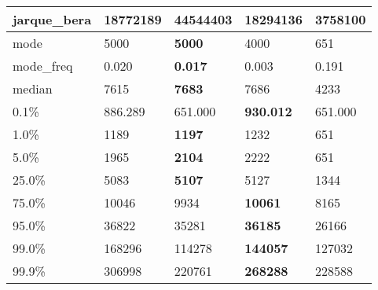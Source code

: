\begin{table}[H]
\begin{tabular}{|l|m{10em}|m{10em}|m{10em}|m{10em}|}
\hline jarque\_bera & 18772189 & \cellcolor[rgb]{0.9, 0.54, 0.52} 44544403 & \bfseries 18294136 & 3758100 \\
\hline mode & 5000 & \bfseries 5000 & 4000 & \cellcolor[rgb]{0.9, 0.54, 0.52} 651 \\
\hline mode\_freq & 0.020 & \bfseries 0.017 & 0.003 & \cellcolor[rgb]{0.9, 0.54, 0.52} 0.191 \\
\hline median & 7615 & \bfseries 7683 & 7686 & \cellcolor[rgb]{0.9, 0.54, 0.52} 4233 \\
\hline 0.1\% & 886.289 & \cellcolor[rgb]{0.9, 0.54, 0.52} 651.000 & \bfseries 930.012 & \cellcolor[rgb]{0.9, 0.54, 0.52} 651.000 \\
\hline 1.0\% & 1189 & \bfseries 1197 & 1232 & \cellcolor[rgb]{0.9, 0.54, 0.52} 651 \\
\hline 5.0\% & 1965 & \bfseries 2104 & 2222 & \cellcolor[rgb]{0.9, 0.54, 0.52} 651 \\
\hline 25.0\% & 5083 & \bfseries 5107 & 5127 & \cellcolor[rgb]{0.9, 0.54, 0.52} 1344 \\
\hline 75.0\% & 10046 & 9934 & \bfseries 10061 & \cellcolor[rgb]{0.9, 0.54, 0.52} 8165 \\
\hline 95.0\% & 36822 & 35281 & \bfseries 36185 & \cellcolor[rgb]{0.9, 0.54, 0.52} 26166 \\
\hline 99.0\% & 168296 & \cellcolor[rgb]{0.9, 0.54, 0.52} 114278 & \bfseries 144057 & 127032 \\
\hline 99.9\% & 306998 & \cellcolor[rgb]{0.9, 0.54, 0.52} 220761 & \bfseries 268288 & 228588 \\
\hline
\end{tabular}
\end{table}
